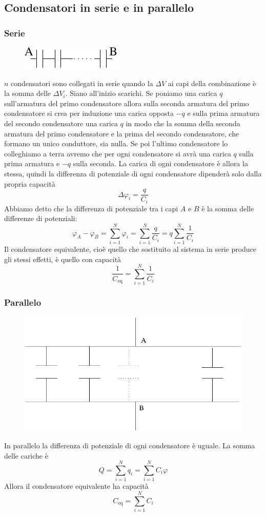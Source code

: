 \subsection{Condensatori in serie e in parallelo}
\subsubsection{Serie}
\begin{figure}[htbp]
\centering
\includegraphics[scale=1.2]{immagini/fisica2/cond2}
\end{figure}
$n$ condensatori sono collegati in serie quando la $\Delta V$ ai capi della combinazione è la somma delle $\Delta V_i$. Siano all'inizio scarichi. Se poniamo una carica $q$ sull'armatura del primo condensatore allora sulla seconda armatura del primo condensatore si crea per induzione una carica opposta $-q$ e sulla prima armatura del secondo condensatore una carica $q$ in modo che la somma della seconda armatura del primo condensatore e la prima del secondo condensatore, che formano un unico conduttore, sia nulla. Se poi l'ultimo condensatore lo colleghiamo a terra avremo che per ogni condensatore si avrà una carica $q$ sulla prima armatura e $-q$ sulla seconda. La carica di ogni condensatore è allora la stessa, quindi la differenza di potenziale di ogni condensatore dipenderà solo dalla propria capacità 
\[\Delta\varphi_i=\frac{q}{C_i}\]
Abbiamo detto che la differenza di potenziale tra i capi $A$ e $B$ è la somma delle differenze di potenziali:
\[\varphi_A-\varphi_B=\sum_{i=1}^N\varphi_i=\sum_{i=1}^N\frac{q}{C_i}=q\sum_{i=1}^N\frac{1}{C_i}\]
Il condensatore equivalente, cioè quello che sostituito al sistema in serie produce gli stessi effetti, è quello con capacità 
\[\frac{1}{C_\text{eq}}=\sum_{i=1}^N\frac{1}{C_i}\]
\subsubsection{Parallelo}
\begin{figure}[htbp]
\centering
\includegraphics[scale=0.5]{immagini/fisica2/cond3}
\end{figure}
In parallelo la differenza di potenziale di ogni condensatore è uguale. La somma delle cariche è 
\[Q=\sum_{i=1}^N q_i=\sum_{i=1}^N C_i\varphi\]
Allora il condensatore equivalente ha capacità 
\[C_\text{eq}=\sum_{i=1}^N C_i\]

